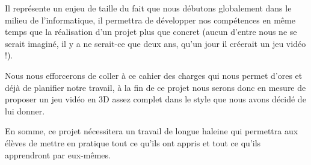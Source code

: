 \documentclass[12pt,a4paper]{article}
\begin{document}
Il représente un enjeu de taille du fait que nous débutons globalement dans le milieu de l'informatique, il permettra de développer nos compétences en même temps que la réalisation d'un projet plus que concret (aucun d'entre nous ne se serait imaginé, il y a ne serait-ce que deux ans, qu'un jour il créerait un jeu vidéo !).

Nous nous efforcerons de coller à ce cahier des charges qui nous permet d'ores et déjà de planifier notre travail, à la fin de ce projet nous serons donc en mesure de proposer un jeu vidéo en 3D assez complet dans le style que nous avons décidé de lui donner.

En somme, ce projet nécessitera un travail de longue haleine qui permettra aux élèves de mettre en pratique tout ce qu'ils ont appris et tout ce qu'ils apprendront par eux-mêmes.
\end{document}
